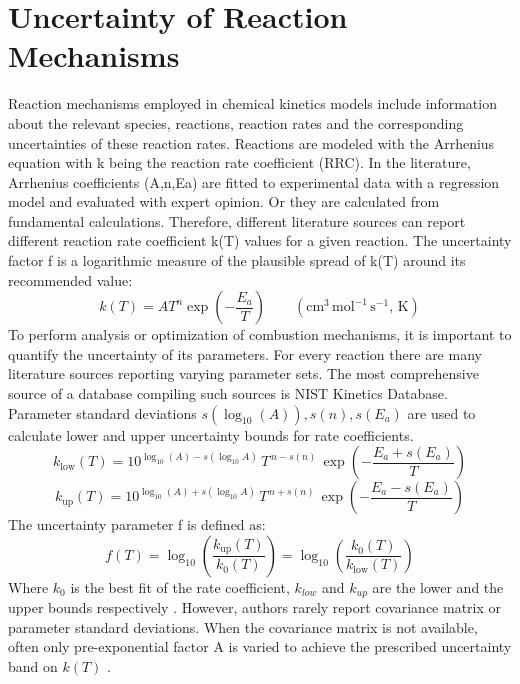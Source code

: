\section{Uncertainty of Reaction Mechanisms}

Reaction mechanisms employed in chemical kinetics models include information about the relevant species, reactions, reaction rates and the corresponding uncertainties of these reaction rates. Reactions are modeled with the Arrhenius equation with k being the reaction rate coefficient (RRC). In the literature, Arrhenius coefficients (A,n,Ea) are fitted to experimental data with a regression model and evaluated with expert opinion. Or they are calculated from fundamental calculations. Therefore, different literature sources can report different reaction rate coefficient k(T) values for a given reaction. The uncertainty factor f is a logarithmic measure of the plausible spread of k(T) around its recommended value:
\begin{equation}
k(T) = A T^{n} \exp\left(-\frac{E_a}{T}\right)
\qquad (\mathrm{cm}^3\,\mathrm{mol}^{-1}\,\mathrm{s}^{-1},\,\mathrm{K})
\end{equation}
To perform analysis or optimization of combustion mechanisms, it is important to quantify the uncertainty of its parameters. For every reaction there are many literature sources reporting varying parameter sets. The most comprehensive source of a database compiling such sources is NIST Kinetics Database.
Parameter standard deviations $s\left(\log_{10}{\left(A\right)}\right), s\left(n\right), s\left(E_a\right)$ are used to calculate lower and upper uncertainty bounds for rate coefficients.
\begin{equation}
k_{\mathrm{low}}(T) =
10^{\log_{10}(A) - s(\log_{10} A)}\,
T^{\,n - s(n)}\,
\exp\left(-\frac{E_a + s(E_a)}{T}\right)
\end{equation}
\begin{equation}
k_{\mathrm{up}}(T) =
10^{\log_{10}(A) + s(\log_{10} A)}\,
T^{\,n + s(n)}\,
\exp\left(-\frac{E_a - s(E_a)}{T}\right)
\end{equation}
The uncertainty parameter f is defined as:
\begin{equation}
f(T) =
\log_{10}\!\left(\frac{k_{\mathrm{up}}(T)}{k_0(T)}\right)
=
\log_{10}\!\left(\frac{k_0(T)}{k_{\mathrm{low}}(T)}\right)
\end{equation}
Where $k_0$ is the best fit of the rate coefficient,  $k_{low}$ and $k_{up}$ are the lower and the upper bounds respectively \cite{nagy_uncertainty_2015}. However, authors rarely report covariance matrix or parameter standard deviations. When the covariance matrix is not available, often only pre-exponential factor A is varied to achieve the prescribed uncertainty band on $k\left(T\right)$ \cite{prager_uncertainty_2013}.  

